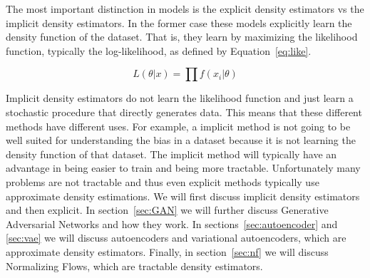 The most important distinction in models is the explicit density estimators vs
the implicit density estimators. In the former case these models explicitly
learn the density function of the dataset. That is, they learn by maximizing the
likelihood function, typically the log-likelihood, as defined by
Equation~\ref{eq:like}. 

\begin{equation}
    L(\theta|x) = \prod f(x_i|\theta)
    \label{eq:like}
\end{equation}

Implicit density estimators do not learn the likelihood
function and just learn a stochastic procedure that directly generates data.
This means that these different methods have different uses. For example, a
implicit method is not going to be well suited for understanding the bias in a
dataset because it is not learning the density function of that dataset. The
implicit method will typically have an advantage in being easier to train and
being more tractable. Unfortunately many problems are not tractable and thus
even explicit methods typically use approximate density estimations. We will
first discuss implicit density estimators and then explicit. In
section~\ref{sec:GAN} we will further discuss Generative Adversarial Networks
and how they work. In sections~\ref{sec:autoencoder} and \ref{sec:vae} we will
discuss autoencoders and variational autoencoders, which are approximate density
estimators. Finally, in section~\ref{sec:nf} we will discuss Normalizing Flows,
which are tractable density estimators.
